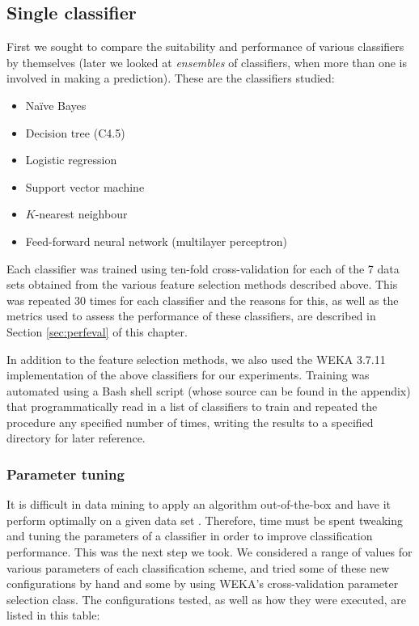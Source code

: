 \subsection{Single classifier}
First we sought to compare the suitability and performance of various
classifiers by themselves (later we looked at \textit{ensembles} of
classifiers, when more than one is involved in making a prediction).
These are the
classifiers studied: 
\begin{itemize}
  \item Na\"{i}ve Bayes
  \item Decision tree (C4.5)
  \item Logistic regression
  \item Support vector machine
  \item $K$-nearest neighbour
  \item Feed-forward neural network (multilayer perceptron)
\end{itemize}

Each classifier was trained using ten-fold cross-validation for each of the
7 data sets obtained from the various feature selection methods described
above. This was repeated 30 times for each classifier and the reasons for
this, as well as the metrics used to assess the performance of these
classifiers, are described in Section \ref{sec:perfeval} of this chapter.

In addition to the feature selection methods, we also used the WEKA 3.7.11
\citep{Hall2009} implementation of the above classifiers for our experiments.
Training was automated using a Bash shell script (whose source can be found
in the appendix) that programmatically read in a list of classifiers to
train and repeated the procedure any specified number of times, writing the
results to a specified directory for later reference.

\subsubsection{Parameter tuning}
It is difficult in data mining to apply an algorithm out-of-the-box and have
it perform optimally on a given data set \citep{Witten2005}. Therefore, time
must be spent tweaking and tuning the parameters of a classifier in order to
improve classification performance. This was the next step we took. We
considered a range of values for various parameters of each classification
scheme, and tried some of these new configurations by hand and some by using
WEKA's cross-validation parameter selection class. The configurations tested,
as well as how they were executed, are listed in this table:

